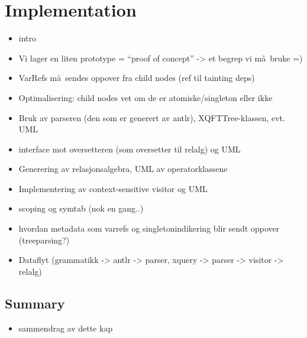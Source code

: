 \chapter{Implementation}
\label{chapter:implementation}

\begin{itemize}
  \item intro
  \item Vi lager en liten prototype = ``proof of concept'' -> et begrep vi m\aa~bruke =)
  \item VarRefs m\aa~sendes oppover fra child nodes (ref til tainting deps)
  \item Optimalisering: child nodes vet om de er atomiske/singleton eller ikke
\end{itemize}

\begin{itemize}
  \item Bruk av parseren (den som er generert av antlr), XQFTTree-klassen, evt.
  UML
  \item interface mot oversetteren (som oversetter til relalg) og UML
  \item Generering av relasjonsalgebra, UML av operatorklassene
  \item Implementering av context-sensitive visitor og UML
  \item scoping og symtab (nok en gang..)
  \item hvordan metadata som varrefs og singletonindikering blir sendt oppover
  (treeparsing?)
  \item Dataflyt (grammatikk -> antlr -> parser, xquery -> parser -> visitor ->
  relalg)
\end{itemize}

\section{Summary}
\label{sect:impl:summary}
\begin{itemize}
  \item sammendrag av dette kap
\end{itemize}